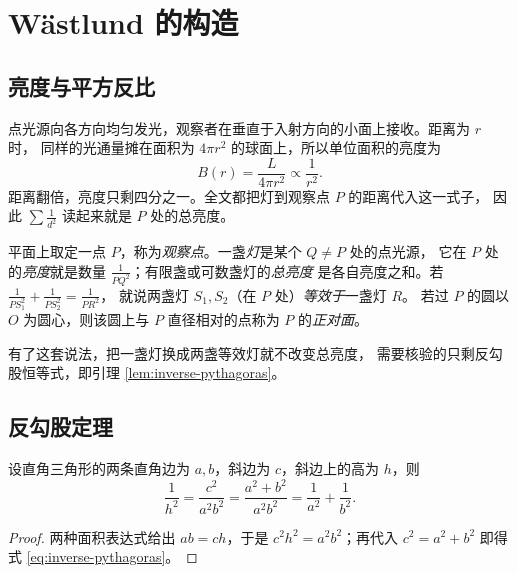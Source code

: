 \section{Wästlund 的构造}\label{sec:wastlund}

\subsection{亮度与平方反比}

点光源向各方向均匀发光，观察者在垂直于入射方向的小面上接收。距离为 $r$ 时，
同样的光通量摊在面积为 $4\pi r^{2}$ 的球面上，所以单位面积的亮度为
\begin{equation}
  B(r)=\frac{L}{4\pi r^{2}}\propto\frac{1}{r^{2}}.
  \label{eq:inverse-square}
\end{equation}
距离翻倍，亮度只剩四分之一。全文都把灯到观察点 $P$ 的距离代入这一式子，
因此 $\sum\frac{1}{d^{2}}$ 读起来就是 $P$ 处的总亮度。

\begin{definition}[灯、亮度与等效]\label{def:lamps}
平面上取定一点 $P$，称为\emph{观察点}。一盏\emph{灯}是某个 $Q\neq P$ 处的点光源，
它在 $P$ 处的\emph{亮度}就是数量 $\frac{1}{PQ^{2}}$；有限盏或可数盏灯的\emph{总亮度}
是各自亮度之和。若 $\frac{1}{PS_{1}^{2}}+\frac{1}{PS_{2}^{2}}=\frac{1}{PR^{2}}$，
就说两盏灯 $S_{1},S_{2}$（在 $P$ 处）\emph{等效于}一盏灯 $R$。
若过 $P$ 的圆以 $O$ 为圆心，则该圆上与 $P$ 直径相对的点称为 $P$ 的\emph{正对面}。
\end{definition}

有了这套说法，把一盏灯换成两盏等效灯就不改变总亮度，
需要核验的只剩反勾股恒等式，即引理 \ref{lem:inverse-pythagoras}。

\subsection{反勾股定理}

\begin{lemma}[反勾股]\label{lem:inverse-pythagoras}
设直角三角形的两条直角边为 $a,b$，斜边为 $c$，斜边上的高为 $h$，则
\begin{equation}
  \frac{1}{h^{2}}
  =\frac{c^{2}}{a^{2}b^{2}}
  =\frac{a^{2}+b^{2}}{a^{2}b^{2}}
  =\frac{1}{a^{2}}+\frac{1}{b^{2}}.
  \label{eq:inverse-pythagoras}
\end{equation}
\end{lemma}

\begin{proof}
两种面积表达式给出 $ab=ch$，于是 $c^{2}h^{2}=a^{2}b^{2}$；再代入 $c^{2}=a^{2}+b^{2}$
即得式 \eqref{eq:inverse-pythagoras}。
\end{proof}

